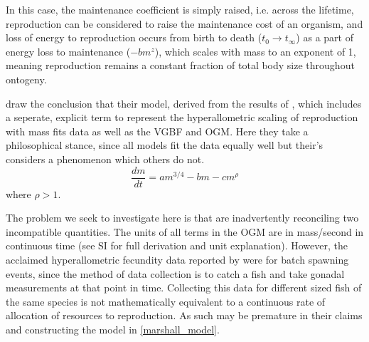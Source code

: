 \documentclass[a4paper]{article} %
\begin{document}
            In this case, the maintenance coefficient is simply raised, i.e. across the lifetime, reproduction can be considered to raise the maintenance cost of an organism, and loss of energy to reproduction occurs from birth to death ($t_0 \rightarrow t_{\infty}$) as a part of energy loss to maintenance ($-bm^z$), which scales with mass to an exponent of 1, meaning reproduction remains a constant fraction of total body size throughout ontogeny.

            \cite{Marshall2019b} draw the conclusion that their model, derived from the results of \cite{Barneche2018d}, which includes a seperate, explicit term to represent the hyperallometric scaling of reproduction with mass fits data as well as the VGBF and \cite{West2001} OGM. Here they take a philosophical stance, since all models fit the data equally well but their's considers a phenomenon which others do not.
            \begin{equation}
                \frac{dm}{dt} = am^{3/4} - bm - cm^{\rho} \label{marshall_model}
            \end{equation}
            where $\rho > 1$.

            The problem we seek to investigate here is that \cite{Marshall2019b} are inadvertently reconciling two incompatible quantities. The units of all terms in the OGM are in mass/second in continuous time (see SI for full derivation and unit explanation). However, the acclaimed hyperallometric fecundity data reported by \cite{Barneche2018d} were for batch spawning events, since the method of data collection is to catch a fish and take gonadal measurements at that point in time. Collecting this data for different sized fish of the same species is not mathematically equivalent to a continuous rate of allocation of resources to reproduction. As such \cite{Malerba2019} may be premature in their claims and constructing the model in \eqref{marshall_model}.
\end{document}
